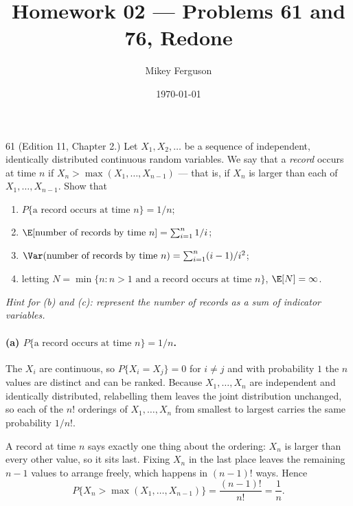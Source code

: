 \documentclass[11pt]{article}
\title{Homework 02 --- Problems 61 and 76, Redone}
\author{Mikey Ferguson}
\date{\today}
\begin{document}
\maketitle


\begin{problem}{61}
  (Edition 11, Chapter 2.) Let $X_1, X_2, \ldots$ be a sequence of independent,
  identically distributed continuous random variables. We say that a
  \emph{record} occurs at time $n$ if $X_n > \max(X_1, \ldots, X_{n-1})$ ---
  that is, if $X_n$ is larger than each of $X_1, \ldots, X_{n-1}$. Show that
  \begin{enumerate}
    \item $P\{\text{a record occurs at time } n\} = 1/n$;
    \item $\E[\text{number of records by time } n] = \sum_{i=1}^{n} 1/i$;
    \item $\Var(\text{number of records by time } n) = \sum_{i=1}^{n} (i-1)/i^2$;
    \item letting $N = \min\{n : n > 1 \text{ and a record occurs at time } n\}$,
          $\E[N] = \infty$.
  \end{enumerate}
  \emph{Hint for (b) and (c): represent the number of records as a sum of
  indicator variables.}
\end{problem}
\paragraph{(a) $P\{\text{a record occurs at time } n\} = 1/n$.}
The $X_i$ are continuous, so $P\{X_i = X_j\} = 0$ for $i \neq j$ and with
probability $1$ the $n$ values are distinct and can be ranked. Because
$X_1, \ldots, X_n$ are independent and identically distributed, relabelling
them leaves the joint distribution unchanged, so each of the $n!$ orderings of
$X_1, \ldots, X_n$ from smallest to largest carries the same probability
$1/n!$.

A record at time $n$ says exactly one thing about the ordering: $X_n$ is larger
than every other value, so it sits last. Fixing $X_n$ in the last place leaves
the remaining $n-1$ values to arrange freely, which happens in $(n-1)!$ ways.
Hence
\[
  P\{X_n > \max(X_1, \ldots, X_{n-1})\}
    = \frac{(n-1)!}{n!}
    = \frac{1}{n}.
\]
\end{document}
